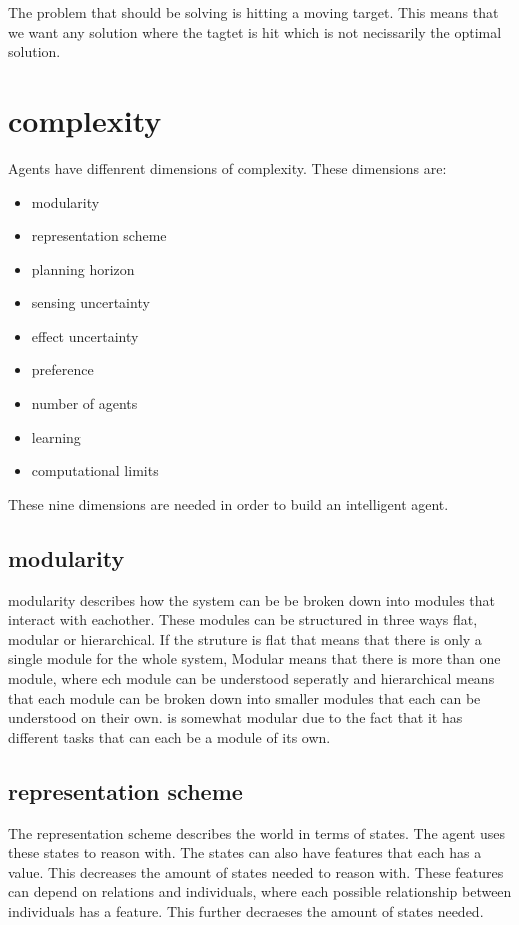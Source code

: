 The problem that \namep should be solving is hitting a moving target. This means
that we want any solution where the tagtet is hit which is not necissarily the
optimal solution. 



\section{complexity}
Agents have diffenrent dimensions of complexity. These dimensions are:
\begin{itemize}
  \item  modularity
  \item representation scheme
  \item planning horizon 
  \item sensing uncertainty
  \item effect uncertainty
  \item preference
  \item number of agents
  \item learning
  \item computational limits
\end{itemize}

These nine dimensions are needed in order to build an intelligent agent.

\subsection{modularity}
modularity describes how the system can be be broken down into modules that
interact with eachother. These modules can be structured in three ways flat,
modular or hierarchical. If the struture is flat that means that there is only a
single module for the whole system, Modular means that there is more than one
module, where ech module can be understood seperatly and hierarchical means that
each module can be broken down into smaller modules that each can be understood
on their own. \namep is somewhat modular due to the fact that it has different
tasks that can each be a module of its own. 

\subsection{representation scheme}
The representation scheme describes the world in terms of states. The agent uses
these states to reason with. The states can also have features that each has a
value. This decreases the amount of states needed to reason with. These features
can depend on relations and individuals, where each possible relationship
between individuals has a feature. This further decraeses the amount of states
needed.






